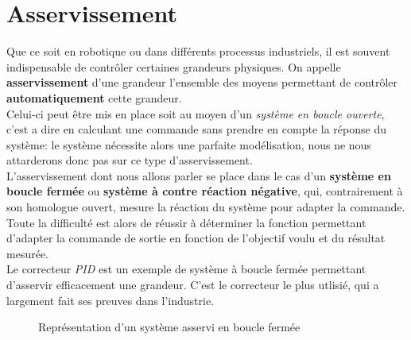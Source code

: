 \chapter{Asservissement}
    Que ce soit en robotique ou dans différents processus industriels, il est souvent indispensable de contrôler certaines grandeurs physiques.
    On appelle \textbf{asservissement} d'une grandeur l'ensemble des moyens permettant de contrôler \textbf{automatiquement} cette grandeur.\\
    Celui-ci peut être mis en place soit au moyen d'un \textit{système en boucle ouverte}, c'est a dire en calculant une commande sans prendre en compte la réponse du système: le système nécessite alors une parfaite modélisation, nous ne nous attarderons donc pas sur ce type d'asservissement.\\
    L'asservissement dont nous allons parler se place dans le cas d'un \textbf{système en boucle fermée} ou \textbf{système à contre réaction négative}, qui, contrairement à son homologue ouvert, mesure la réaction du système pour adapter la commande. Toute la difficulté est alors de réussir à déterminer la fonction permettant d'adapter la commande de sortie en fonction de l'objectif voulu et du résultat mesurée.\\
    Le correcteur \textit{PID} est un exemple de système à boucle fermée permettant d'asservir efficacement une grandeur. C'est le correcteur le plus utlisié, qui a largement fait ses preuves dans l'industrie.
    \begin{figure}[h]
        \centering
        \caption{Représentation d'un système asservi en boucle fermée}
    \end{figure}


    \newpage
